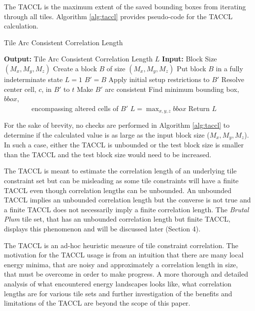 The TACCL is the maximum extent of the saved bounding boxes from iterating through all tiles.
Algorithm \ref{alg:taccl} provides pseudo-code for the TACCL calculation.

\begin{algorithm}
  \caption{Tile Arc Consistent Correlation Length}
  \label{alg:taccl}
  \begin{algorithmic}
    \State \textbf{Output:} Tile Arc Consistent Correlation Length $L$
    \State \textbf{Input:} Block Size $(M _ x, M _ y, M _ z)$
    \State Create a block $B$ of size $(M _ x, M _ y, M _ z)$
    \State Put block $B$ in a fully indeterminate state
    \State $L=1$
      \State $B' = B$
      \State Apply initial setup restrictions to $B'$
      \State Resolve center cell, $c$, in $B'$ to $t$
      \State Make $B'$ arc consistent
      \State Find minimum bounding box, $bbox$, \\ \ \ \ \ \ \ \ \ encompassing altered cells of $B'$
        \State $L = \max _ { x, y, z } bbox $
      \EndIf
    \EndFor
    \State Return $L$
  \end{algorithmic}
\end{algorithm}

For the sake of brevity, no checks are performed in Algorithm \ref{alg:taccl} to determine if the calculated value
is as large as the input block size ($M _ x, M _ y, M _ z$).
In such a case, either the TACCL is unbounded or the test block size is smaller than the TACCL and the test block size would
need to be increased.

The TACCL is meant to estimate the correlation length of an underlying tile constraint set but can be misleading as some
tile constraints will have a finite TACCL even though correlation lengths can be unbounded.
An unbounded TACCL implies an unbounded correlation length but the converse is not true and a finite TACCL
does not necessarily imply a finite correlation length.
The \textit{Brutal Plum} tile set, that has an unbounded correlation length but finite TACCL,
displays this phenomenon and will be discussed later (Section 4).

The TACCL is an ad-hoc heuristic measure of tile constraint correlation.
The motivation for the TACCL usage is from an intuition that there are many local energy minima, that are noisy and approximately a correlation length in size, that must
be overcome in order to make progress.
A more thorough and detailed analysis of what encountered energy landscapes looks like,
what correlation lengths are for various tile sets and further investigation of the benefits and limitations
of the TACCL are beyond the scope of this paper.

